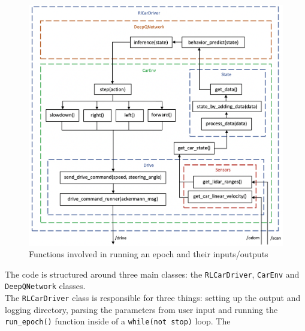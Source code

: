 \begin{figure}[H]
\centering
\includegraphics[scale=0.38]{Figures/inputs_outputs.png}
\caption{Functions involved in running an epoch and their inputs/outputs}
\label{inputs_outputs}
\end{figure}
The code is structured around three main classes: the \verb|RLCarDriver|, \verb|CarEnv| and \verb|DeepQNetwork| classes. \\
The \verb |RLCarDriver| class is responsible for three things: setting up the output and logging directory, parsing the parameters from user input and running the \verb |run_epoch()| function inside of a \verb |while(not stop)| loop. The \verb ||


